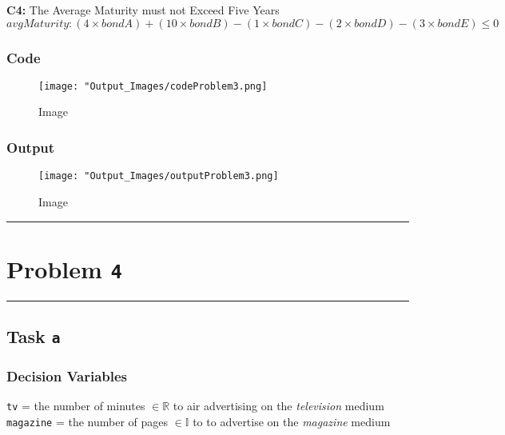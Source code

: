 \documentclass[
  12pt,
]{article}
\begin{document}
\textbf{C4:} The Average Maturity must not Exceed Five Years \[
avgMaturity: (4 \times bondA) + (10 \times bondB) - (1 \times bondC) 
- (2 \times bondD) - (3 \times bondE) \leq 0
\]

\hypertarget{code}{%
\subsubsection{Code}\label{code}}

\begin{figure}
\centering
\texttt{[image: "Output\_Images/codeProblem3.png]}
\caption{Image}
\end{figure}

\hypertarget{output}{%
\subsubsection{Output}\label{output}}

\begin{figure}
\centering
\texttt{[image: "Output\_Images/outputProblem3.png]}
\caption{Image}
\end{figure}

\begin{center}\rule{0.5\linewidth}{0.5pt}\end{center}

\hypertarget{problem-4}{%
\section{\texorpdfstring{Problem
\texttt{4}}{Problem 4}}\label{problem-4}}

\begin{center}\rule{0.5\linewidth}{0.5pt}\end{center}

\hypertarget{task-a-1}{%
\subsection{\texorpdfstring{Task \texttt{a}}{Task a}}\label{task-a-1}}

\hypertarget{decision-variables-1}{%
\subsubsection{Decision Variables}\label{decision-variables-1}}

\texttt{tv} = the number of minutes \(\in \mathbb{R}\) to air
advertising on the \emph{television} medium\\
\texttt{magazine} = the number of pages \(\in \mathbb{I}\) to to
advertise on the \emph{magazine} medium
\end{document}
